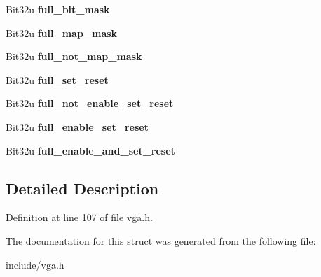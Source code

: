 \begin{DoxyCompactItemize}
\item 
\hypertarget{structVGA__Config_aeafb31cb767815375d30a6f0ba48e319}{Bit32u {\bfseries full\-\_\-bit\-\_\-mask}}\label{structVGA__Config_aeafb31cb767815375d30a6f0ba48e319}

\item 
\hypertarget{structVGA__Config_a4b6aad5a5153cac8c62619fec4fe15b4}{Bit32u {\bfseries full\-\_\-map\-\_\-mask}}\label{structVGA__Config_a4b6aad5a5153cac8c62619fec4fe15b4}

\item 
\hypertarget{structVGA__Config_a9621b79f2d85534101795b9a38e6c165}{Bit32u {\bfseries full\-\_\-not\-\_\-map\-\_\-mask}}\label{structVGA__Config_a9621b79f2d85534101795b9a38e6c165}

\item 
\hypertarget{structVGA__Config_ac7477048acf903ad2b40036fd7e17f8e}{Bit32u {\bfseries full\-\_\-set\-\_\-reset}}\label{structVGA__Config_ac7477048acf903ad2b40036fd7e17f8e}

\item 
\hypertarget{structVGA__Config_a7317f0353f9262ed950c47779ead4a45}{Bit32u {\bfseries full\-\_\-not\-\_\-enable\-\_\-set\-\_\-reset}}\label{structVGA__Config_a7317f0353f9262ed950c47779ead4a45}

\item 
\hypertarget{structVGA__Config_a045f0b43adea277828837e3cc956000e}{Bit32u {\bfseries full\-\_\-enable\-\_\-set\-\_\-reset}}\label{structVGA__Config_a045f0b43adea277828837e3cc956000e}

\item 
\hypertarget{structVGA__Config_ac1a974050a7c80f93935ad23fc5ba1f5}{Bit32u {\bfseries full\-\_\-enable\-\_\-and\-\_\-set\-\_\-reset}}\label{structVGA__Config_ac1a974050a7c80f93935ad23fc5ba1f5}

\end{DoxyCompactItemize}


\subsection{Detailed Description}


Definition at line 107 of file vga.\-h.



The documentation for this struct was generated from the following file\-:\begin{DoxyCompactItemize}
\item 
include/vga.\-h\end{DoxyCompactItemize}
